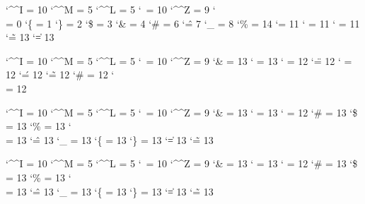 \startcatcodetable \prtcatcodes
    \catcode`\^^I = 10
    \catcode`\^^M =  5
    \catcode`\^^L =  5
    \catcode`\    = 10
    \catcode`\^^Z =  9
    \catcode`\\   =  0
    \catcode`\{   =  1
    \catcode`\}   =  2
    \catcode`\$   =  3
    \catcode`\&   =  4
    \catcode`\#   =  6
    \catcode`\^   =  7
    \catcode`\_   =  8
    \catcode`\%   = 14
    \catcode`\@   = 11
    \catcode`\!   = 11
    \catcode`\?   = 11
    \catcode`\~   = 13
    \catcode`\|   = 13
\stopcatcodetable

\startcatcodetable \xmlcatcodesn
    \catcode`\^^I = 10 %
    \catcode`\^^M =  5 %
    \catcode`\^^L =  5 %
    \catcode`\    = 10 %
    \catcode`\^^Z =  9 %
    \catcode`\&   = 13 %
    \catcode`\<   = 13 %
    \catcode`\>   = 12
    \catcode`\"   = 12 %
    \catcode`\/   = 12 %
    \catcode`\'   = 12 %
    \catcode`\~   = 12 %
    \catcode`\#   = 12 %
    \catcode`\\   = 12 %
\stopcatcodetable

\startcatcodetable \xmlcatcodese
    \catcode`\^^I = 10 %
    \catcode`\^^M =  5 %
    \catcode`\^^L =  5 %
    \catcode`\    = 10 %
    \catcode`\^^Z =  9 %
    \catcode`\&   = 13 %
    \catcode`\<   = 13 %
    \catcode`\>   = 12
    \catcode`\#   = 13
    \catcode`\$   = 13
    \catcode`\%   = 13
    \catcode`\\   = 13
    \catcode`\^   = 13
    \catcode`\_   = 13
    \catcode`\{   = 13
    \catcode`\}   = 13
    \catcode`\|   = 13
    \catcode`\~   = 13
\stopcatcodetable

\startcatcodetable \xmlcatcodesr
    \catcode`\^^I = 10 %
    \catcode`\^^M =  5 %
    \catcode`\^^L =  5 %
    \catcode`\    = 10 %
    \catcode`\^^Z =  9 %
    \catcode`\&   = 13 %
    \catcode`\<   = 13 %
    \catcode`\>   = 12
    \catcode`\#   = 13
    \catcode`\$   = 13
    \catcode`\%   = 13
    \catcode`\\   = 13
    \catcode`\^   = 13
    \catcode`\_   = 13
    \catcode`\{   = 13
    \catcode`\}   = 13
    \catcode`\|   = 13
    \catcode`\~   = 13
\stopcatcodetable

